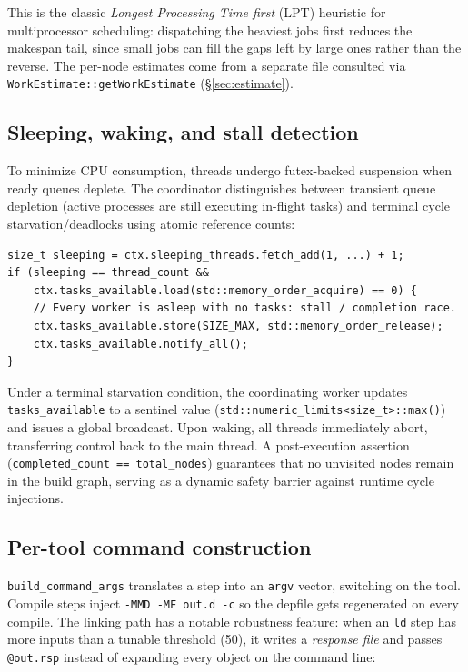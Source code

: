 \documentclass[11pt]{article}
\begin{document}
This is the classic \emph{Longest Processing Time first} (LPT) heuristic for
multiprocessor scheduling: dispatching the heaviest jobs first reduces the
makespan tail, since small jobs can fill the gaps left by large ones rather than
the reverse. The per-node estimates come from a separate file consulted via
\lstinline|WorkEstimate::getWorkEstimate| (\S\ref{sec:estimate}).

\subsection{Sleeping, waking, and stall detection}

To minimize CPU consumption, threads undergo futex-backed suspension when
ready queues deplete. The coordinator distinguishes between transient queue
depletion (active processes are still executing in-flight tasks) and terminal
cycle starvation/deadlocks using atomic reference counts:

\begin{lstlisting}
size_t sleeping = ctx.sleeping_threads.fetch_add(1, ...) + 1;
if (sleeping == thread_count &&
    ctx.tasks_available.load(std::memory_order_acquire) == 0) {
    // Every worker is asleep with no tasks: stall / completion race.
    ctx.tasks_available.store(SIZE_MAX, std::memory_order_release);
    ctx.tasks_available.notify_all();
}
\end{lstlisting}

Under a terminal starvation condition, the coordinating worker updates \lstinline|tasks_available| to a sentinel value (\lstinline|std::numeric_limits<size_t>::max()|) and issues a global broadcast. Upon waking, all threads immediately abort, transferring control back to the main thread. A post-execution assertion (\lstinline|completed_count == total_nodes|) guarantees that no unvisited nodes remain in the build graph, serving as a dynamic safety barrier against runtime cycle injections.

\subsection{Per-tool command construction}

\lstinline|build_command_args| translates a step into an \lstinline|argv|
vector, switching on the tool. Compile steps inject \lstinline|-MMD -MF out.d -c|
so the depfile gets regenerated on every compile. The linking path has a
notable robustness feature: when an \lstinline|ld| step has more inputs than a
tunable threshold (50), it writes a \emph{response file} and passes
\lstinline|@out.rsp| instead of expanding every object on the command line:
\end{document}

